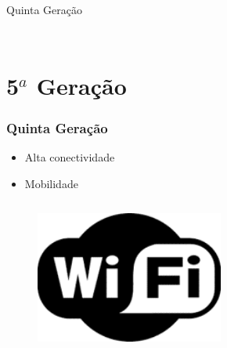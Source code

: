 \documentclass[aspectratio=169,
				xcolor=table]{beamer}
\begin{document}
\begin{frame}[t]{Quinta Geração}
\begin{columns}
\begin{column}{0.35\textwidth}
\begin{figure}
				\end{figure}
			\end{column}
		\end{columns}
	\end{frame}		

	\section{5${}^a$ Geração}
	\begin{frame}
		\frametitle{Quinta Geração}
		\begin{itemize}
			\item Alta conectividade
			\vspace{1em}
			\item Mobilidade
		\end{itemize}
		\begin{columns}
			\begin{column}{0.23\textwidth}
				\begin{figure}
					\centering
					\includegraphics[width=0.9\textwidth, keepaspectratio]{../figs/cap03/wifi} 			
				\end{figure}
			\end{column}
			\begin{column}{0.23\textwidth}
				\begin{figure}
					\centering

\end{figure}
\end{column}
\end{columns}
\end{frame}
\end{document}
